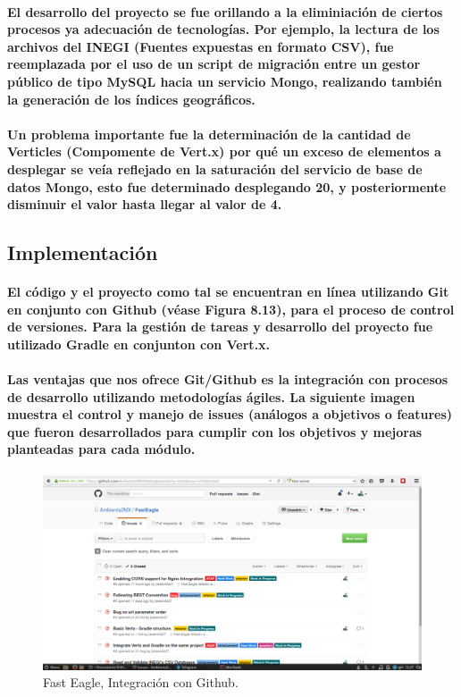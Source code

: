     \paragraph{El desarrollo del proyecto se fue orillando a la eliminiación de ciertos procesos ya adecuación de tecnologías. Por ejemplo, la lectura de los archivos del INEGI (Fuentes expuestas en formato CSV), fue reemplazada por el uso de un script de migración entre un gestor público de tipo MySQL hacia un servicio Mongo, realizando también la generación de los índices geográficos.}
    \paragraph{Un problema importante fue la determinación de la cantidad de Verticles (Compomente de Vert.x) por qué un exceso de elementos a desplegar se veía reflejado en la saturación del servicio de base de datos Mongo, esto fue determinado desplegando 20, y posteriormente disminuir el valor hasta llegar al valor de 4.}
  \subsection{Implementación}
    \paragraph{El código y el proyecto como tal se encuentran en línea utilizando Git\cite{38} en conjunto con Github\cite{39} (véase Figura 8.13), para el proceso de control de versiones. Para la gestión de tareas y desarrollo del proyecto fue utilizado Gradle en conjunton con Vert.x.}
    \paragraph{Las ventajas que nos ofrece Git/Github es la integración con procesos de desarrollo utilizando metodologías ágiles. La siguiente imagen muestra el control y manejo de issues (análogos a objetivos o features) que fueron desarrollados para cumplir con los objetivos y mejoras planteadas para cada módulo.}
    \begin{figure}[h!]
        \centering
          \includegraphics[width=\textwidth]{./images/FastEagleIssues.png}
          \caption{Fast Eagle, Integración con Github.}
    \end{figure}
